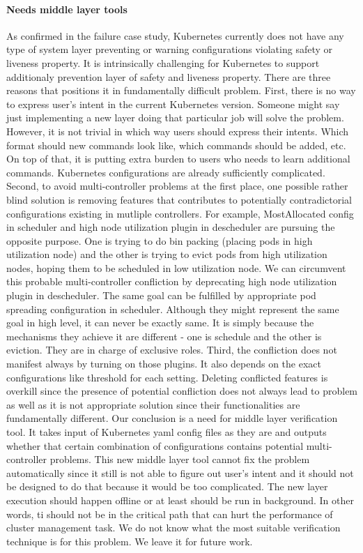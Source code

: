 \paragraph*{Needs middle layer tools}
As confirmed in the failure case study, Kubernetes currently does not have any type of system layer preventing or warning configurations violating safety or liveness property. It is intrinsically challenging for Kubernetes to support additionaly prevention layer of safety and liveness property. There are three reasons that positions it in fundamentally difficult problem. 
First, there is no way to express user's intent in the current Kubernetes version. Someone might say just implementing a new layer doing that particular job will solve the problem. However, it is not trivial in which way users should express their intents. Which format should new commands look like, which commands should be added, etc. On top of that, it is putting extra burden to users who needs to learn additional commands. Kubernetes configurations are already sufficiently complicated. 
Second, to avoid multi-controller problems at the first place, one possible rather blind solution is removing features that contributes to potentially contradictorial configurations existing in mutliple controllers. For example, MostAllocated config in scheduler and high node utilization plugin in descheduler are pursuing the opposite purpose. One is trying to do bin packing (placing pods in high utilization node) and the other is trying to evict pods from high utilization nodes, hoping them to be scheduled in low utilization node. We can circumvent this probable multi-controller confliction by deprecating high node utilization plugin in descheduler. The same goal can be fulfilled by appropriate pod spreading configuration in scheduler. Although they might represent the same goal in high level, it can never be exactly same. It is simply because the mechanisms they achieve it are different - one is schedule and the other is eviction. They are in charge of exclusive roles.
Third, the confliction does not manifest always by turning on those plugins. It also depends on the exact configurations like threshold for each setting. Deleting conflicted features is overkill since the presence of potential confliction does not always lead to problem as well as it is not appropriate solution since their functionalities are fundamentally different.
Our conclusion is a need for middle layer verification tool. It takes input of Kubernetes yaml config files as they are and outputs whether that certain combination of configurations contains potential multi-controller problems. This new middle layer tool cannot fix the problem automatically since it still is not able to figure out user's intent and it should not be designed to do that because it would be too complicated. The new layer execution should happen offline or at least should be run in background. In other words, ti should not be in the critical path that can hurt the performance of cluster management task. We do not know what the most suitable verification technique is for this problem. We leave it for future work.


